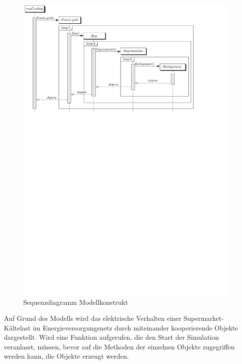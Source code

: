 \begin{figure}[h]
	\begin{center}
		\includegraphics[scale=0.8]{images/Theorie_Super/sequence_one}
	\end{center}
\caption{Sequenzdiagramm Modellkonstrukt}
\label{fig:uml_sequence}
\end{figure}

Auf Grund des Modells wird das elektrische Verhalten einer
Supermarket-K\"altelast im Energieversorgungsnetz durch miteinander
kooperierende Objekte dargestellt. Wird eine Funktion aufgerufen, die den Start
der Simulation veranlasst, m\"ussen, bevor auf die Methoden der einzelnen
Objekte zugegriffen werden kann, die Objekte erzeugt werden.

